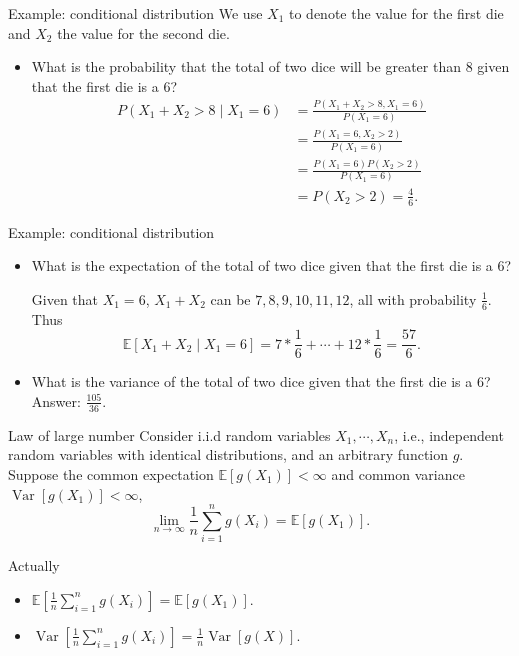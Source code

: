 \documentclass[10pt]{beamer}
\newcommand{\expect}{\mathbb{E}}
\newcommand{\var}{\operatorname{Var}}
\begin{document}
\begin{frame}{Example: conditional distribution}
We use $X_1$ to denote the value for the first die and $X_2$ the value for the second die. 
\begin{itemize}
    \item What is the probability that the total of two dice will be greater than $8$ given that the first die is a $6$? 
    \begin{align*}
        P(X_1 + X_2 > 8 \mid X_1 = 6) 
            &= \frac{P(X_1 + X_2 > 8, X_1 = 6)}{P(X_1 = 6)} \\
            &= \frac{P(X_1 = 6, X_2 > 2)}{P(X_1 = 6)} \\
            &= \frac{P(X_1 = 6)P(X_2 > 2)}{P(X_1 = 6)} \\
            &= P(X_2 > 2) = \frac{4}{6}. 
    \end{align*}
\end{itemize}
\end{frame}

\begin{frame}{Example: conditional distribution}
  \begin{itemize}
    \item What is the expectation of the total of two dice given that the first die is a $6$? 
    
    Given that $X_1 = 6$, $X_1 + X_2$ can be $7, 8, 9, 10, 11, 12$, all with probability $\frac{1}{6}$. Thus 
    \[
        \expect[X_1 + X_2 \mid X_1 = 6] = 7*\frac{1}{6} + \cdots + 12*\frac{1}{6} = \frac{57}{6}.
    \]
    \item What is the variance of the total of two dice given that the first die is a $6$? Answer: $\frac{105}{36}$.
  \end{itemize}
\end{frame}

\begin{frame}{Law of large number}
    Consider i.i.d random variables $X_1, \cdots, X_n$, i.e., independent random variables with identical distributions, and an arbitrary function $g$. Suppose the common expectation $\expect[g(X_1)] < \infty$ and  common variance $\var[g(X_1)] < \infty$,
    \[
        \lim_{n \to \infty} \frac{1}{n}\sum_{i = 1}^n g(X_i) = \expect[g(X_1)].  
    \]
    
    Actually 
    \begin{itemize}
        \item $\expect[\frac{1}{n}\sum_{i = 1}^n g(X_i)] = \expect[g(X_1)]$.
        \item $\var[\frac{1}{n}\sum_{i = 1}^n g(X_i)] = \frac{1}{n}\var[g(X)]$.
    \end{itemize}
\end{frame}
\end{document}
